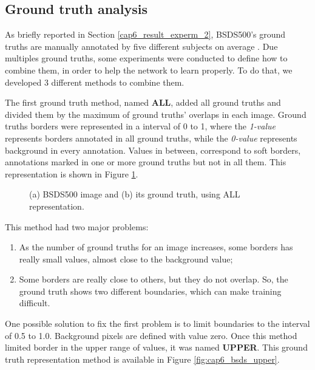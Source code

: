 \subsection{Ground truth analysis}
\label{ssec:groundtruth_analysis}

As briefly reported in Section \ref{cap6_result_experm_2}, BSDS500's ground truths are manually annotated by five different subjects on average \cite{amfm_pami2011}.
Due multiples ground truths, some experiments were conducted to define how to combine them, in order to help the network to learn properly.
To do that, we developed 3 different methods to combine them.

The first ground truth method, named \textbf{ALL}, added all ground truths and divided them by the maximum of ground truths' overlaps in each image.
Ground truths borders were represented in a interval of 0 to 1, where the \textit{1-value} represents borders annotated in all ground truths, while the \textit{0-value} represents background in every annotation.
Values in between, correspond to soft borders, annotations marked in one or more ground truths but not in all them.
This representation is shown in Figure \ref{fig:cap6_bsds_all}.

\begin{figure}%
  \centering
  \caption{(a) BSDS500 image and (b) its ground truth, using ALL representation.}
  \hfill
  \sourceOwn
  \label{fig:cap6_bsds_all}
\end{figure}

This method had two major problems:

\begin{enumerate}[noitemsep]
    \item As the number of ground truths for an image increases, some borders has really small values, almost close to the background value;
    \item Some borders are really close to others, but they do not overlap. So, the ground truth shows two different boundaries, which can make training difficult.
\end{enumerate}

One possible solution to fix the first problem is to limit boundaries to the interval of 0.5 to 1.0.
Background pixels are defined with value zero.
Once this method limited border in the upper range of values, it was named \textbf{UPPER}.
This ground truth representation method is available in Figure \ref{fig:cap6_bsds_upper}.

